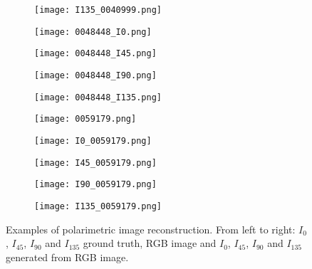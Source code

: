 \begin{figure}
	\begin{subfigure}{.105\textwidth}
		\centering
		\texttt{[image: I135\_0040999.png]}
	\end{subfigure}
	\begin{subfigure}{.11\textwidth}
		\centering
		\texttt{[image: 0048448\_I0.png]}
	\end{subfigure}%
	\begin{subfigure}{.11\textwidth}
		\centering
		\texttt{[image: 0048448\_I45.png]}
	\end{subfigure}%
	\begin{subfigure}{.11\textwidth}
		\centering
		\texttt{[image: 0048448\_I90.png]}
	\end{subfigure}%
	\begin{subfigure}{.11\textwidth}
		\centering
		\texttt{[image: 0048448\_I135.png]}
	\end{subfigure}%
	\begin{subfigure}{.105\textwidth}
		\centering
		\texttt{[image: 0059179.png]}
	\end{subfigure}%
	\begin{subfigure}{.105\textwidth}
		\centering
		\texttt{[image: I0\_0059179.png]}
	\end{subfigure}%
	\begin{subfigure}{.105\textwidth}
		\centering
		\texttt{[image: I45\_0059179.png]}
	\end{subfigure}%
	\begin{subfigure}{.105\textwidth}
		\centering
		\texttt{[image: I90\_0059179.png]}
	\end{subfigure}%
	\begin{subfigure}{.105\textwidth}
		\centering
		\texttt{[image: I135\_0059179.png]}
	\end{subfigure}
	\caption{Examples  of polarimetric image reconstruction. From left to right: $I_0$, $I_{45}$, $I_{90}$ and $I_{135}$ ground truth, RGB image and $I_0$, $I_{45}$, $I_{90}$ and $I_{135}$ generated from RGB image.}
	\label{fig:reco_polar}
\end{figure}



